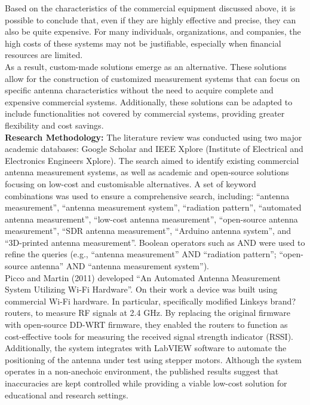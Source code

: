 Based on the characteristics of the commercial equipment discussed above, it is possible to conclude that, even if they are highly effective and precise, they can also be quite expensive. For many individuals, organizations, and companies, the high costs of these systems may not be justifiable, especially when financial resources are limited.\\
\vspace{0.1em}
\indent As a result, custom-made solutions emerge as an alternative. These solutions allow for the construction of customized measurement systems that can focus on specific antenna characteristics without the need to acquire complete and expensive commercial systems. Additionally, these solutions can be adapted to include functionalities not covered by commercial systems, providing greater flexibility and cost savings.\\
\vspace{0.1em}
\indent \textbf{Research Methodology:} The literature review was conducted using two major academic databases: Google Scholar and IEEE Xplore (Institute of Electrical and Electronics Engineers Xplore). The search aimed to identify existing commercial antenna measurement systems, as well as academic and open-source solutions focusing on low-cost and customisable alternatives. A set of keyword combinations was used to ensure a comprehensive search, including: ``antenna measurement'', ``antenna measurement system'', ``radiation pattern'', ``automated antenna measurement'', ``low-cost antenna measurement'', ``open-source antenna measurement'', ``SDR antenna measurement'', ``Arduino antenna system'', and ``3D-printed antenna measurement''. Boolean operators such as AND were used to refine the queries (e.g., ``antenna measurement'' AND ``radiation pattern''; ``open-source antenna'' AND ``antenna measurement system'').\\
\vspace{0.1em}
\indent Picco and Martin (2011) developed ``An Automated Antenna Measurement System Utilizing Wi-Fi Hardware''. On their work a device was built using commercial Wi-Fi hardware\cite{6157745}. In particular, specifically modified Linksys brand? routers, to measure RF signals at 2.4 GHz. By replacing the original firmware with open-source DD-WRT firmware, they enabled the routers to function as cost-effective tools for measuring the received signal strength indicator (RSSI). Additionally, the system integrates with LabVIEW software to automate the positioning of the antenna under test using stepper motors. Although the system operates in a non-anechoic environment, the published results suggest that inaccuracies are kept controlled while providing a viable low-cost solution for educational and research settings.

